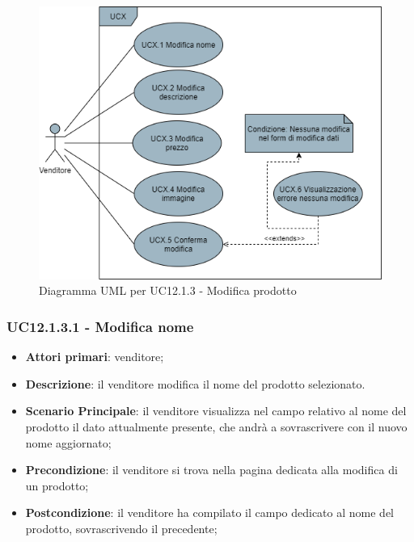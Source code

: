 \begin{figure}[H]
\centering
\includegraphics[scale=0.6]{res/UseCase/Immagini/ModificaProdotto}
\caption{Diagramma UML per UC12.1.3 - Modifica prodotto}
\end{figure}

\subsubsection{UC12.1.3.1 - Modifica nome}
\begin{itemize}
\item \textbf{Attori primari}: venditore;
\item \textbf{Descrizione}: il venditore modifica il nome del prodotto selezionato.
\item \textbf{Scenario Principale}: il venditore visualizza nel campo relativo al nome del prodotto il dato attualmente presente, che andrà a sovrascrivere con il nuovo nome aggiornato;
\item \textbf{Precondizione}: il venditore si trova nella pagina dedicata alla modifica di un prodotto;
\item \textbf{Postcondizione}: il venditore ha compilato il campo dedicato al nome del prodotto, sovrascrivendo il precedente;
\end{itemize}

